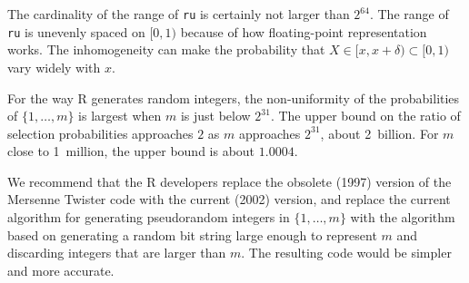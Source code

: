 \documentclass[12pt]{article}
\begin{document}
The cardinality of the range of \texttt{ru} is certainly not larger than $2^{64}$.
The range of \texttt{ru} is unevenly spaced on $[0, 1)$
because of how floating-point representation works.
The inhomogeneity can make the probability that $X \in [x, x+\delta) \subset [0, 1)$
vary widely with $x$.

For the way R generates random integers, the non-uniformity of the probabilities of 
$\{1, \ldots, m\}$ is largest when $m$ is just below $2^{31}$. 
The upper bound on the ratio of selection probabilities approaches $2$ as $m$
approaches $2^{31}$, about 2~billion. 
For $m$ close to 1~million, the upper bound is about $1.0004$.

We recommend that the R developers replace the obsolete (1997) version of the Mersenne Twister code with the current (2002) version, 
and replace the current algorithm for generating pseudorandom integers in $\{1, \ldots, m\}$ with the algorithm based on generating a 
random bit string large enough to represent $m$ and discarding integers that are larger than $m$.
The resulting code would be simpler and more accurate. 



\end{document}
